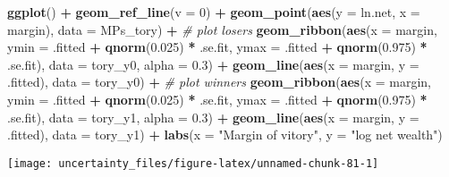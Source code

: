 \documentclass[]{book}
\newenvironment{Shaded}{\begin{snugshade}}{\end{snugshade}}
\newcommand{\CommentTok}[1]{\textcolor[rgb]{0.56,0.35,0.01}{\textit{#1}}}
\newcommand{\DataTypeTok}[1]{\textcolor[rgb]{0.13,0.29,0.53}{#1}}
\newcommand{\DecValTok}[1]{\textcolor[rgb]{0.00,0.00,0.81}{#1}}
\newcommand{\FloatTok}[1]{\textcolor[rgb]{0.00,0.00,0.81}{#1}}
\newcommand{\KeywordTok}[1]{\textcolor[rgb]{0.13,0.29,0.53}{\textbf{#1}}}
\newcommand{\NormalTok}[1]{#1}
\newcommand{\OperatorTok}[1]{\textcolor[rgb]{0.81,0.36,0.00}{\textbf{#1}}}
\newcommand{\StringTok}[1]{\textcolor[rgb]{0.31,0.60,0.02}{#1}}
\theoremstyle{definition}
\theoremstyle{definition}
\theoremstyle{definition}
\theoremstyle{remark}
\begin{document}
\begin{Shaded}
\begin{Highlighting}[]
\KeywordTok{ggplot}\NormalTok{() }\OperatorTok{+}
\StringTok{  }\KeywordTok{geom_ref_line}\NormalTok{(}\DataTypeTok{v =} \DecValTok{0}\NormalTok{) }\OperatorTok{+}
\StringTok{  }\KeywordTok{geom_point}\NormalTok{(}\KeywordTok{aes}\NormalTok{(}\DataTypeTok{y =}\NormalTok{ ln.net, }\DataTypeTok{x =}\NormalTok{ margin), }\DataTypeTok{data =}\NormalTok{ MPs_tory) }\OperatorTok{+}
\StringTok{  }\CommentTok{# plot losers}
\StringTok{  }\KeywordTok{geom_ribbon}\NormalTok{(}\KeywordTok{aes}\NormalTok{(}\DataTypeTok{x =}\NormalTok{ margin,}
                  \DataTypeTok{ymin =}\NormalTok{ .fitted }\OperatorTok{+}\StringTok{ }\KeywordTok{qnorm}\NormalTok{(}\FloatTok{0.025}\NormalTok{) }\OperatorTok{*}\StringTok{ }\NormalTok{.se.fit,}
                  \DataTypeTok{ymax =}\NormalTok{ .fitted }\OperatorTok{+}\StringTok{ }\KeywordTok{qnorm}\NormalTok{(}\FloatTok{0.975}\NormalTok{) }\OperatorTok{*}\StringTok{ }\NormalTok{.se.fit),}
              \DataTypeTok{data =}\NormalTok{ tory_y0, }\DataTypeTok{alpha =} \FloatTok{0.3}\NormalTok{) }\OperatorTok{+}
\StringTok{  }\KeywordTok{geom_line}\NormalTok{(}\KeywordTok{aes}\NormalTok{(}\DataTypeTok{x =}\NormalTok{ margin, }\DataTypeTok{y =}\NormalTok{ .fitted), }\DataTypeTok{data =}\NormalTok{ tory_y0) }\OperatorTok{+}
\StringTok{  }\CommentTok{# plot winners}
\StringTok{  }\KeywordTok{geom_ribbon}\NormalTok{(}\KeywordTok{aes}\NormalTok{(}\DataTypeTok{x =}\NormalTok{ margin,}
                  \DataTypeTok{ymin =}\NormalTok{ .fitted }\OperatorTok{+}\StringTok{ }\KeywordTok{qnorm}\NormalTok{(}\FloatTok{0.025}\NormalTok{) }\OperatorTok{*}\StringTok{ }\NormalTok{.se.fit,}
                  \DataTypeTok{ymax =}\NormalTok{ .fitted }\OperatorTok{+}\StringTok{ }\KeywordTok{qnorm}\NormalTok{(}\FloatTok{0.975}\NormalTok{) }\OperatorTok{*}\StringTok{ }\NormalTok{.se.fit),}
              \DataTypeTok{data =}\NormalTok{ tory_y1, }\DataTypeTok{alpha =} \FloatTok{0.3}\NormalTok{) }\OperatorTok{+}
\StringTok{  }\KeywordTok{geom_line}\NormalTok{(}\KeywordTok{aes}\NormalTok{(}\DataTypeTok{x =}\NormalTok{ margin, }\DataTypeTok{y =}\NormalTok{ .fitted), }\DataTypeTok{data =}\NormalTok{ tory_y1) }\OperatorTok{+}
\StringTok{  }\KeywordTok{labs}\NormalTok{(}\DataTypeTok{x =} \StringTok{"Margin of vitory"}\NormalTok{, }\DataTypeTok{y =} \StringTok{"log net wealth"}\NormalTok{)}
\end{Highlighting}
\end{Shaded}

\begin{center}\texttt{[image: uncertainty\_files/figure-latex/unnamed-chunk-81-1]} \end{center}
\end{document}
